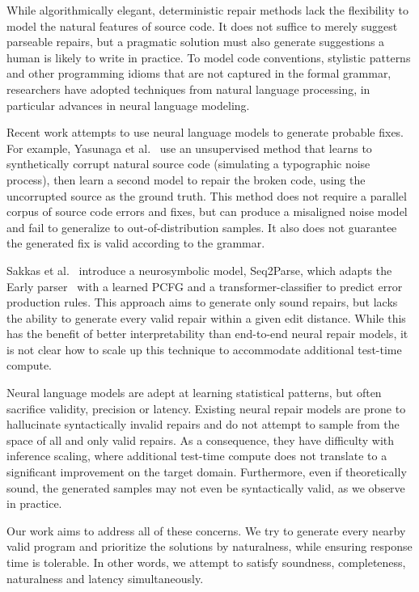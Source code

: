 While algorithmically elegant, deterministic repair methods lack the flexibility to model the natural features of source code. It does not suffice to merely suggest parseable repairs, but a pragmatic solution must also generate suggestions a human is likely to write in practice. To model code conventions, stylistic patterns and other programming idioms that are not captured in the formal grammar, researchers have adopted techniques from natural language processing, in particular advances in neural language modeling.

Recent work attempts to use neural language models to generate probable fixes. For example, Yasunaga et al.~\cite{yasunaga2021break} use an unsupervised method that learns to synthetically corrupt natural source code (simulating a typographic noise process), then learn a second model to repair the broken code, using the uncorrupted source as the ground truth. This method does not require a parallel corpus of source code errors and fixes, but can produce a misaligned noise model and fail to generalize to out-of-distribution samples. It also does not guarantee the generated fix is valid according to the grammar.

Sakkas et al.~\cite{sakkas2022seq2parse} introduce a neurosymbolic model, Seq2Parse, which adapts the Early parser~\cite{earley1970efficient} with a learned PCFG and a transformer-classifier to predict error production rules. This approach aims to generate only sound repairs, but lacks the ability to generate every valid repair within a given edit distance. While this has the benefit of better interpretability than end-to-end neural repair models, it is not clear how to scale up this technique to accommodate additional test-time compute.

Neural language models are adept at learning statistical patterns, but often sacrifice validity, precision or latency. Existing neural repair models are prone to hallucinate syntactically invalid repairs and do not attempt to sample from the space of all and only valid repairs. As a consequence, they have difficulty with inference scaling, where additional test-time compute does not translate to a significant improvement on the target domain. Furthermore, even if theoretically sound, the generated samples may not even be syntactically valid, as we observe in practice.

Our work aims to address all of these concerns. We try to generate every nearby valid program and prioritize the solutions by naturalness, while ensuring response time is tolerable. In other words, we attempt to satisfy soundness, completeness, naturalness and latency simultaneously.

